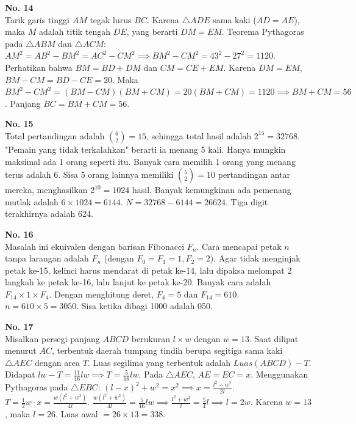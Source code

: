 \documentclass[11pt, a4paper]{article}
\begin{document}
\textbf{No. 14}\\
Tarik garis tinggi $AM$ tegak lurus $BC$. Karena $\triangle ADE$ sama kaki ($AD=AE$), maka $M$ adalah titik tengah $DE$, yang berarti $DM = EM$.
Teorema Pythagoras pada $\triangle ABM$ dan $\triangle ACM$:
$AM^2 = AB^2 - BM^2 = AC^2 - CM^2 \implies BM^2 - CM^2 = 43^2 - 27^2 = 1120$.
Perhatikan bahwa $BM = BD + DM$ dan $CM = CE + EM$. Karena $DM = EM$, $BM - CM = BD - CE = 20$.
Maka $BM^2 - CM^2 = (BM - CM)(BM + CM) = 20(BM + CM) = 1120 \implies BM + CM = 56$.
Panjang $BC = BM + CM = 56$.

\begin{center}
\end{center}

\textbf{No. 15}\\
Total pertandingan adalah $\binom{6}{2} = 15$, sehingga total hasil adalah $2^{15} = 32768$.
"Pemain yang tidak terkalahkan" berarti ia menang 5 kali. Hanya mungkin maksimal ada 1 orang seperti itu.
Banyak cara memilih 1 orang yang menang terus adalah 6. Sisa 5 orang lainnya memiliki $\binom{5}{2} = 10$ pertandingan antar mereka, menghasilkan $2^{10} = 1024$ hasil.
Banyak kemungkinan ada pemenang mutlak adalah $6 \times 1024 = 6144$.
$N = 32768 - 6144 = 26624$. Tiga digit terakhirnya adalah 624.

\textbf{No. 16}\\
Masalah ini ekuivalen dengan barisan Fibonacci $F_n$. Cara mencapai petak $n$ tanpa larangan adalah $F_n$ (dengan $F_0 = F_1 = 1, F_2 = 2$).
Agar tidak menginjak petak ke-15, kelinci harus mendarat di petak ke-14, lalu dipaksa melompat 2 langkah ke petak ke-16, lalu lanjut ke petak ke-20.
Banyak cara adalah $F_{14} \times 1 \times F_4$.
Dengan menghitung deret, $F_4 = 5$ dan $F_{14} = 610$.
$n = 610 \times 5 = 3050$. Sisa ketika dibagi 1000 adalah 050.

\textbf{No. 17}\\
Misalkan persegi panjang $ABCD$ berukuran $l \times w$ dengan $w = 13$. Saat dilipat menurut $AC$, terbentuk daerah tumpang tindih berupa segitiga sama kaki $\triangle AEC$ dengan area $T$.
Luas segilima yang terbentuk adalah $Luas(ABCD) - T$.
Didapat $lw - T = \frac{11}{16} lw \implies T = \frac{5}{16} lw$.
Pada $\triangle AEC$, $AE = EC = x$. Menggunakan Pythagoras pada $\triangle EBC$: $(l-x)^2 + w^2 = x^2 \implies x = \frac{l^2+w^2}{2l}$.
$T = \frac{1}{2} w \cdot x = \frac{w(l^2+w^2)}{4l}$.
$\frac{w(l^2+w^2)}{4l} = \frac{5}{16} lw \implies \frac{l^2+w^2}{l} = \frac{5}{4} l \implies l = 2w$.
Karena $w = 13$, maka $l = 26$. Luas awal $= 26 \times 13 = 338$.
\end{document}

